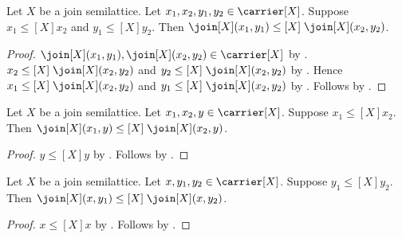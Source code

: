 \begin{proposition}\label{join_monotone}
    Let $X$ be a join semilattice.
    Let $x_1,x_2,y_1,y_2\in\carrier[X]$.
    Suppose $x_1\mathrel{\leq[X]}x_2$ and
        $y_1\mathrel{\leq[X]}y_2$.
    Then $\join[X](x_1,y_1)\mathrel{\leq[X]}\join[X](x_2,y_2)$.
\end{proposition}
\begin{proof}
    $\join[X](x_1,y_1),\join[X](x_2,y_2)\in\carrier[X]$ by
        .
    $x_2\mathrel{\leq[X]}\join[X](x_2,y_2)$ and
        $y_2\mathrel{\leq[X]}\join[X](x_2,y_2)$ by .
    Hence $x_1\mathrel{\leq[X]}\join[X](x_2,y_2)$ and
        $y_1\mathrel{\leq[X]}\join[X](x_2,y_2)$ by
        .
    Follows by .
\end{proof}

\begin{proposition}\label{join_monotone_left}
    Let $X$ be a join semilattice.
    Let $x_1,x_2,y\in\carrier[X]$.
    Suppose $x_1\mathrel{\leq[X]}x_2$.
    Then $\join[X](x_1,y)\mathrel{\leq[X]}\join[X](x_2,y)$.
\end{proposition}
\begin{proof}
    $y\mathrel{\leq[X]}y$ by
        .
    Follows by .
\end{proof}

\begin{proposition}\label{join_monotone_right}
    Let $X$ be a join semilattice.
    Let $x,y_1,y_2\in\carrier[X]$.
    Suppose $y_1\mathrel{\leq[X]}y_2$.
    Then $\join[X](x,y_1)\mathrel{\leq[X]}\join[X](x,y_2)$.
\end{proposition}
\begin{proof}
    $x\mathrel{\leq[X]}x$ by
        .
    Follows by .
\end{proof}
